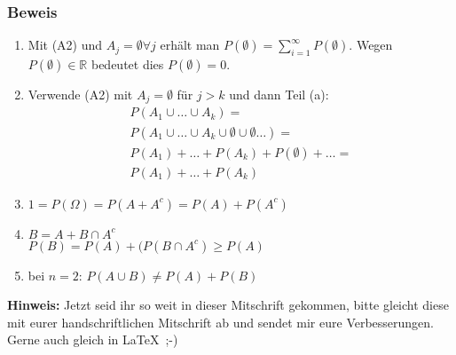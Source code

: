 \subsubsection{Beweis}
\begin{enumerate}
	\item Mit (A2) und $A_j=\emptyset \forall j$ erhält man $P(\emptyset) = \sum_{i=1}^\infty P(\emptyset)$. 
	Wegen $P(\emptyset) \in \mathbb{R}$ bedeutet dies $P(\emptyset) = 0$.
	\item Verwende (A2) mit $A_j=\emptyset$ für $j>k$ und dann Teil (a):
	\begin{eqnarray*}
		P(A_1 \cup \ldots \cup A_k) = \\
		P(A_1 \cup \ldots \cup A_k \cup \emptyset \cup \emptyset \ldots) = \\
		P(A_1) + \ldots + P(A_k) + P(\emptyset) + \ldots = \\
		P(A_1) + \ldots + P(A_k)
	\end{eqnarray*}
	\item $1 = P(\Omega) = P(A + A^c) = P(A) + P(A^c)$
	\item $B = A + B \cap A^c$\\
	$P(B) = P(A) + (P(B\cap A^c) \geq P(A)$
	\item bei $n=2$: $P(A \cup B) \neq P(A) + P(B)$
\end{enumerate}


\textbf{Hinweis:} Jetzt seid ihr so weit in dieser Mitschrift gekommen, bitte gleicht diese mit eurer handschriftlichen Mitschrift ab und sendet mir eure Verbesserungen. Gerne auch gleich in \LaTeX\ ;-)